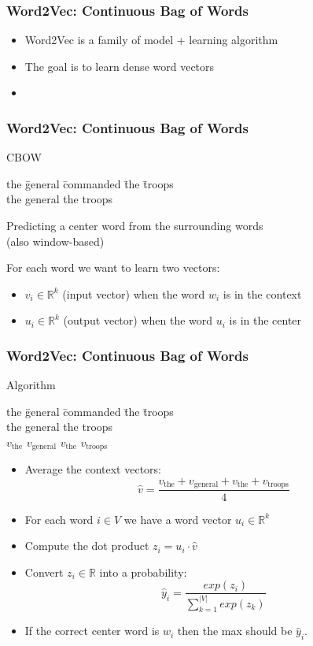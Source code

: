 \begin{frame}
\frametitle{Word2Vec: Continuous Bag of Words}
\begin{itemize}[<+->]
	\item Word2Vec is a family of model + learning algorithm
	\item The goal is to learn dense word vectors
	\item 
\end{itemize}
\end{frame}

\begin{frame}
\frametitle{Word2Vec: Continuous Bag of Words}
\begin{alertblock}{CBOW}
\begin{tabbing}
the \= general \= commanded \= the \= troops\kill \\
the \> general \> \rlap{\underline{\hphantom{commanded}}} \> the \> troops
\end{tabbing}
Predicting a center word from the surrounding words \\
(also window-based)
\end{alertblock}
\pause 
\begin{block}{For each word we want to learn two vectors:}
\begin{itemize}
	\item $v_i \in \mathbb{R}^k$ (input vector) when the word $w_i$ is in the context
	\item $u_i \in \mathbb{R}^k$ (output vector) when the word $u_i$ is in the center 
\end{itemize}
\end{block}
\end{frame}

\begin{frame}
\frametitle{Word2Vec: Continuous Bag of Words}
\begin{block}{Algorithm}
\begin{tabbing}
the \= general \= commanded \= the \= troops\kill \\
the \> general \> \rlap{\underline{\hphantom{commanded}}} \> the \> troops \\
$v_{\textrm{the}}$ \> $v_{\textrm{general}}$ \> \> $v_{\textrm{the}}$ \> $v_{\textrm{troops}}$ 
\end{tabbing}
\begin{itemize}[<+->]
	\item Average the context vectors:
	\[ \hat{v} = \frac{v_{\textrm{the}} + v_{\textrm{general}} + v_{\textrm{the}} + v_{\textrm{troops}}}{4} \]
	\item For each word $i \in V$ we have a word vector $u_i \in \mathbb{R}^k$
	\item Compute the dot product $z_i = u_i \cdot \hat{v}$
	\item Convert $z_i \in \mathbb{R}$ into a probability:
	\[ \hat{y}_i = \frac{exp(z_i)}{\sum_{k=1}^{|V|} exp(z_k)} \]
	\item If the correct center word is $w_i$ then the max should be $\hat{y}_i$.
\end{itemize}	
\end{block}
\end{frame}

